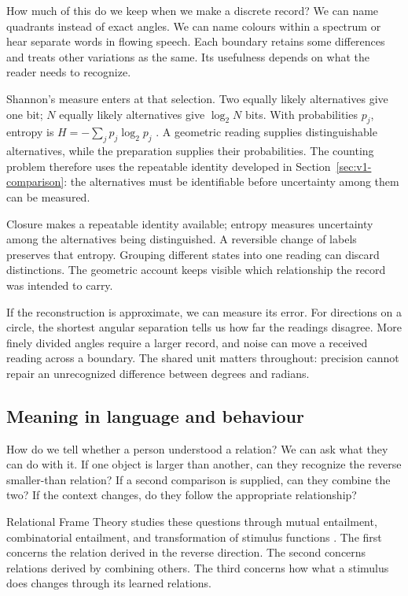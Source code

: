 \documentclass[11pt,a4paper]{article}
\theoremstyle{definition}
\begin{document}
How much of this do we keep when we make a discrete record? We
can name quadrants instead of exact angles. We can name colours
within a spectrum or hear separate words in flowing speech. Each
boundary retains some differences and treats other variations as
the same. Its usefulness depends on what the reader needs to
recognize.

Shannon's measure enters at that selection. Two equally likely
alternatives give one bit; $N$ equally likely alternatives give
$\log_2N$ bits. With probabilities $p_j$, entropy is
$H=-\sum_jp_j\log_2p_j$ \citep{Shannon1948}. A geometric reading
supplies distinguishable alternatives, while the preparation
supplies their probabilities. The counting problem therefore uses the
repeatable identity developed in Section~\ref{sec:v1-comparison}:
the alternatives must be identifiable before uncertainty among
them can be measured.

Closure makes a repeatable identity available; entropy measures
uncertainty among the alternatives being distinguished. A
reversible change of labels preserves that entropy. Grouping
different states into one reading can discard distinctions. The
geometric account keeps visible which relationship the record
was intended to carry.

If the reconstruction is approximate, we can measure its error.
For directions on a circle, the shortest angular separation tells
us how far the readings disagree. More finely divided angles
require a larger record, and noise can move a received reading
across a boundary. The shared unit matters throughout: precision
cannot repair an unrecognized difference between degrees and
radians.

\subsection{Meaning in language and behaviour}

How do we tell whether a person understood a relation? We can ask
what they can do with it. If one object is larger than another,
can they recognize the reverse smaller-than relation? If a second
comparison is supplied, can they combine the two? If the context
changes, do they follow the appropriate relationship?

Relational Frame Theory studies these questions through mutual
entailment, combinatorial entailment, and transformation of
stimulus functions \citep{HayesEtAl2001,ACBS}. The first concerns
the relation derived in the reverse direction. The second
concerns relations derived by combining others. The third
concerns how what a stimulus does changes through its learned
relations.
\end{document}
